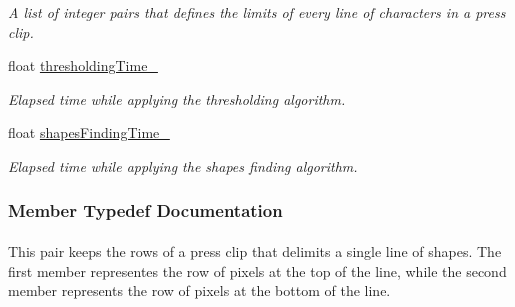 \begin{CompactItemize}
\begin{CompactList}\small\item\em A list of integer pairs that defines the limits of every line of characters in a press clip. \item\end{CompactList}\item 
\hypertarget{class_segmenter_1b02328044551876a7b878fc1549bc70}{
float \hyperlink{class_segmenter_1b02328044551876a7b878fc1549bc70}{thresholdingTime\_\-}}
\label{class_segmenter_1b02328044551876a7b878fc1549bc70}

\begin{CompactList}\small\item\em Elapsed time while applying the thresholding algorithm. \item\end{CompactList}\item 
\hypertarget{class_segmenter_e0ade77ddbdc2f6c5eaa1efe372c5a7b}{
float \hyperlink{class_segmenter_e0ade77ddbdc2f6c5eaa1efe372c5a7b}{shapesFindingTime\_\-}}
\label{class_segmenter_e0ade77ddbdc2f6c5eaa1efe372c5a7b}

\begin{CompactList}\small\item\em Elapsed time while applying the shapes finding algorithm. \item\end{CompactList}\end{CompactItemize}


\subsubsection{Member Typedef Documentation}
\hypertarget{class_segmenter_ae134abed2f1d55197820f4027d10999}{
\paragraph[LineMarker]{}\hfill}
\label{class_segmenter_ae134abed2f1d55197820f4027d10999}


This pair keeps the rows of a press clip that delimits a single line of shapes. The first member representes the row of pixels at the top of the line, while the second member represents the row of pixels at the bottom of the line.

